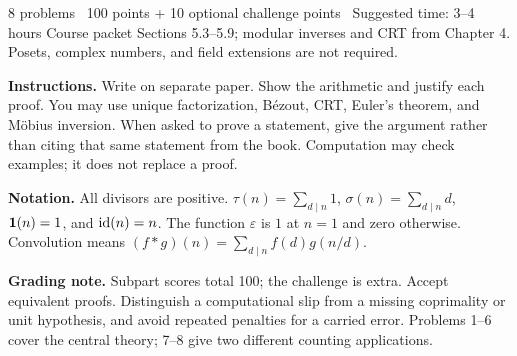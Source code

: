 
\newcommand{\setname}{Problem Set 3}

{8 problems \textbar\ 100 points + 10 optional challenge points \textbar\ Suggested time: 3--4 hours}
{Course packet Sections 5.3--5.9; modular inverses and CRT from Chapter 4.
Posets, complex numbers, and field extensions are not required.}

\textbf{Instructions.} Write on separate paper. Show the arithmetic and
justify each proof. You may use unique factorization, B\'ezout, CRT,
Euler's theorem, and M\"obius inversion. When asked to prove a statement,
give the argument rather than citing that same statement from the book.
Computation may check examples; it does not replace a proof.

\textbf{Notation.} All divisors are positive.
$\tau(n)=\sum_{d\mid n}1$, $\sigma(n)=\sum_{d\mid n}d$,
$\mathbf{1}(n)=1$, and $\operatorname{id}(n)=n$. The function $\varepsilon$ is $1$ at
$n=1$ and zero otherwise. Convolution means
$(f*g)(n)=\sum_{d\mid n}f(d)g(n/d)$.

\ifsolutions
\textbf{Grading note.} Subpart scores total 100; the challenge is extra.
Accept equivalent proofs. Distinguish a computational slip from a missing
coprimality or unit hypothesis, and avoid repeated penalties for a carried error.
Problems 1--6 cover the central theory; 7--8 give two different counting applications.
\fi


